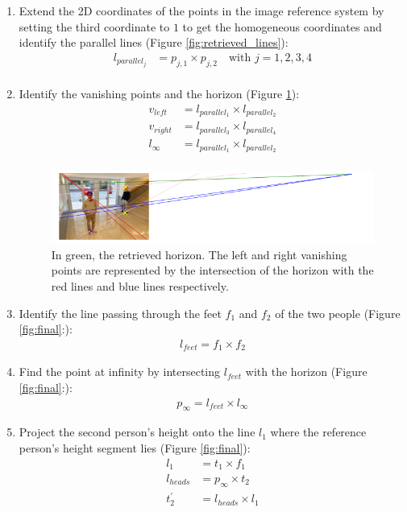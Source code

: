 \begin{enumerate}
    
    \item Extend the 2D coordinates of the points in the image reference system by setting the third coordinate to $1$ to get the homogeneous coordinates and identify the parallel lines (Figure \ref{fig:retrieved_lines}):
    \begin{align*}
        l_{parallel_j} &= p_{j,1} \times p_{j,2} \quad \text{with }j=1,2,3,4\\
    \end{align*}
    
    \item Identify the vanishing points and the horizon (Figure \ref{fig:wide}):
    \begin{align*}
        v_{left} &= l_{parallel_1} \times l_{parallel_2}\\
        v_{right} &= l_{parallel_3} \times l_{parallel_4}\\
        l_{\infty} &= l_{parallel_1} \times l_{parallel_2}\\
    \end{align*}

\begin{figure}
    \centering
    \includegraphics[width=0.6\linewidth]{img/wide.png}
    \caption{In green, the retrieved horizon. The left and right vanishing points are represented by the intersection of the horizon with the red lines and blue lines respectively.}
    \label{fig:wide}
\end{figure}

    \item Identify the line passing through the feet $f_1$ and $f_2$ of the two people (Figure \ref{fig:final}:):
    \begin{align*}
        l_{feet} = f_{1} \times f_{2}
    \end{align*}
    
    \item Find the point at infinity by intersecting $l_{feet}$ with the horizon (Figure \ref{fig:final}:):
    \begin{align*}
        p_{\infty} = l_{feet} \times l_{\infty}
    \end{align*}

    \item Project the second person's height onto the line $l_1$ where the reference person's height segment lies (Figure \ref{fig:final}):
    \begin{align*}
        l_{1} &= t_1 \times f_1 \\
        l_{heads} &= p_{\infty} \times t_2 \\
        t_2^{\prime} &= l_{heads} \times l_{1}
    \end{align*}


\end{enumerate}
